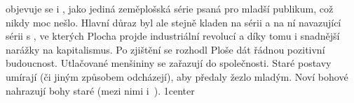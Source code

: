 \documentclass{article}
\begin{document}
{objevuje se i , jako jediná zeměplošská série psaná pro mladší publikum, což  nikdy moc nešlo.\wline
Hlavní důraz byl ale stejně kladen na sérii  a na ní navazující sérii s , ve kterých Plocha projde industriální revolucí a díky tomu i snadnější narážky na kapitalismus.
Po zjištění  se rozhodl Ploše dát řádnou pozitivní budoucnost.
Utlačované menšininy se zařazují do společnosti.
Staré postavy umírají (či jiným způsobem odcházejí), aby předaly žezlo mladým.
Noví bohové nahrazují bohy staré (mezi nimi i~).
}{1}{center}
\end{document}
